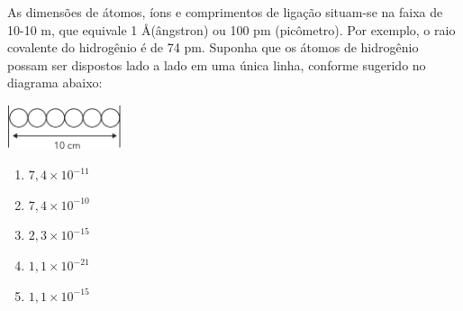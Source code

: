 As dimensões de átomos, íons e comprimentos de ligação situam-se na faixa de 10-10 m, que equivale 1 \AA (ângstron) ou 100 pm (picômetro). Por exemplo, o raio covalente do hidrogênio é de 74 pm. Suponha que os átomos de hidrogênio possam ser dispostos lado a lado em uma única linha, conforme sugerido no diagrama abaixo:

\begin{center}
\includegraphics[width=0.25\textwidth]{figure.png}
\end{center}

\begin{enumerate}[label = (\alph*)]
	\item $7,4 \times 10^{-11}$
	\item $7,4 \times 10^{-10}$
	\item $2,3 \times 10^{-15}$
	\item $1,1 \times 10^{-21}$
	\item $1,1 \times 10^{-15}$
\end{enumerate}

